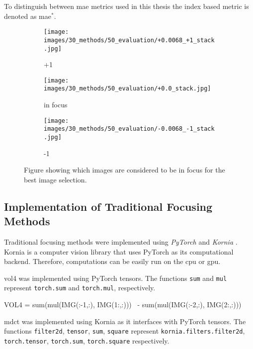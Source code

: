 To distinguish between \ac{mae} metrics used in this thesis the index based metric is denoted as \ac{mae}$^*$.

\begin{figure}[tb]
    \centering
    \begin{subfigure}[t]{0.3\textwidth}
        \centering
        \texttt{[image: images/30\_methods/50\_evaluation/+0.0068\_+1\_stack.jpg]}
        \caption{+1}
    \end{subfigure}
    \begin{subfigure}[t]{0.3\textwidth}
        \centering
        \texttt{[image: images/30\_methods/50\_evaluation/+0.0\_stack.jpg]}
        \caption{in focus}
    \end{subfigure}
    \begin{subfigure}[t]{0.3\textwidth}
        \centering
        \texttt{[image: images/30\_methods/50\_evaluation/-0.0068\_-1\_stack.jpg]}
        \caption{-1}
    \end{subfigure}

    \caption{Figure showing which images are considered to be in focus for the best image selection.}
    \label{fig:Methods:Data:InFocusExampleImages}
\end{figure}


\subsection{Implementation of Traditional Focusing Methods}
\label{sec:Methods:Evaluation:Traditional}

Traditional focusing methods were implemented using \emph{PyTorch} \cite{paszke2019pytorch} and \emph{Kornia} \cite{riba2020kornia}. Kornia is a computer vision library that uses PyTorch as its computational backend. Therefore, computations can be easily run on the \ac{cpu} or \ac{gpu}.


\Ac{vol4} was implemented using PyTorch tensors. The functions \texttt{sum} and \texttt{mul} represent \texttt{torch.sum} and \texttt{torch.mul}, respectively.

\begin{python}
VOL4 = sum(mul(IMG(:-1,:), IMG(1:,:)))      \
        - sum(mul(IMG(:-2,:), IMG(2:,:)))
\end{python}


\Ac{mdct} was implemented using Kornia as it interfaces with PyTorch tensors. The functions \texttt{filter2d}, \texttt{tensor}, \texttt{sum}, \texttt{square} represent \texttt{kornia.filters.filter2d}, \texttt{torch.tensor}, \texttt{torch.sum}, \texttt{torch.square} respectively.

